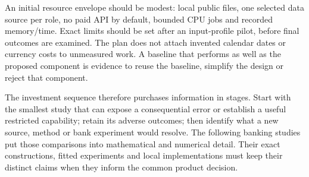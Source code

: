 An initial resource envelope should be modest: local public files, one
selected data source per role, no paid API by default, bounded CPU jobs
and recorded memory/time. Exact limits should be set after an
input-profile pilot, before final outcomes are examined. The plan does
not attach invented calendar dates or currency costs to unmeasured work.
A baseline that performs as well as the proposed component is evidence
to reuse the baseline, simplify the design or reject that component.

The investment sequence therefore purchases information in stages. Start with the smallest study that can expose a consequential error or establish a useful restricted capability; retain its adverse outcomes; then identify what a new source, method or bank experiment would resolve. The following banking studies put those comparisons into mathematical and numerical detail. Their exact constructions, fitted experiments and local implementations must keep their distinct claims when they inform the common product decision.


